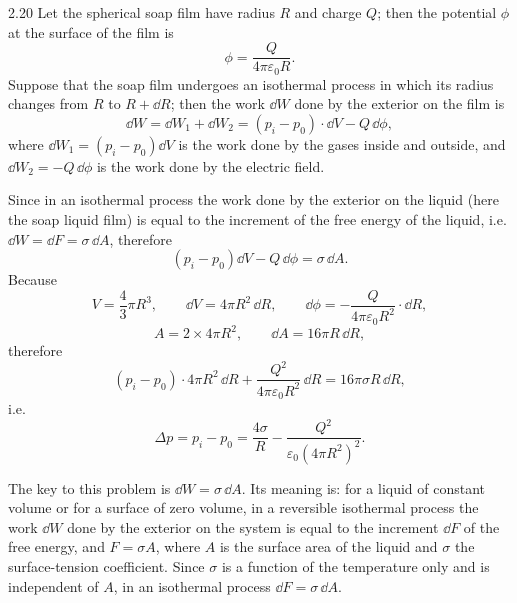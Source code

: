 \begin{solution}{2.20}
Let the spherical soap film have radius $R$ and charge $Q$; then the potential $\phi$ at the
surface of the film is
\begin{equation*}
\phi = \frac{Q}{4\pi\varepsilon_0R}.
\end{equation*}
Suppose that the soap film undergoes an isothermal process in which its radius changes from $R$
to $R+\dd R$; then the work $\dd W$ done by the exterior on the film is
\begin{equation*}
\dd W = \dd W_1 + \dd W_2 = (p_i-p_0)\cdot\dd V - Q\,\dd\phi,
\end{equation*}
where $\dd W_1=(p_i-p_0)\dd V$ is the work done by the gases inside and outside, and
$\dd W_2=-Q\,\dd\phi$ is the work done by the electric field.

Since in an isothermal process the work done by the exterior on the liquid (here the soap liquid
film) is equal to the increment of the free energy of the liquid, i.e. $\dd W=\dd F=\sigma\,\dd A$,
therefore
\begin{equation*}
(p_i-p_0)\dd V - Q\,\dd\phi = \sigma\,\dd A .
\end{equation*}
Because
\begin{equation*}
V = \frac{4}{3}\pi R^3,\qquad \dd V = 4\pi R^2\,\dd R,\qquad
\dd\phi = -\frac{Q}{4\pi\varepsilon_0R^2}\cdot\dd R,
\end{equation*}
\begin{equation*}
A = 2\times 4\pi R^2,\qquad \dd A = 16\pi R\,\dd R,
\end{equation*}
therefore
\begin{equation*}
(p_i-p_0)\cdot 4\pi R^2\,\dd R + \frac{Q^2}{4\pi\varepsilon_0R^2}\,\dd R
= 16\pi\sigma R\,\dd R,
\end{equation*}
i.e.
\begin{equation*}
\Delta p = p_i - p_0 = \frac{4\sigma}{R} - \frac{Q^2}{\varepsilon_0\left(4\pi R^2\right)^2}.
\end{equation*}

\begin{commentary}
The key to this problem is $\dd W=\sigma\,\dd A$. Its meaning is: for a liquid of constant volume
or for a surface of zero volume, in a reversible isothermal process the work $\dd W$ done by the
exterior on the system is equal to the increment $\dd F$ of the free energy, and $F=\sigma A$,
where $A$ is the surface area of the liquid and $\sigma$ the surface-tension coefficient. Since
$\sigma$ is a function of the temperature only and is independent of $A$, in an isothermal
process $\dd F=\sigma\,\dd A$.
\end{commentary}
\end{solution}

